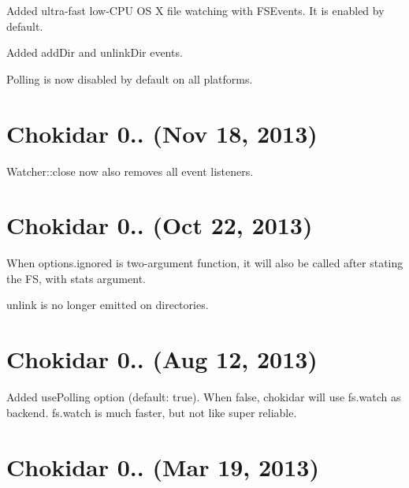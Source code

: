 \begin{DoxyItemize}
\item Added ultra-\/fast low-\/\+C\+PU OS X file watching with F\+S\+Events. It is enabled by default.
\item Added {\ttfamily add\+Dir} and {\ttfamily unlink\+Dir} events.
\item Polling is now disabled by default on all platforms.
\end{DoxyItemize}

\section*{Chokidar 0.. (Nov 18, 2013)}


\begin{DoxyItemize}
\item {\ttfamily Watcher\+::close} now also removes all event listeners.
\end{DoxyItemize}

\section*{Chokidar 0.. (Oct 22, 2013)}


\begin{DoxyItemize}
\item When {\ttfamily options.\+ignored} is two-\/argument function, it will also be called after stating the FS, with {\ttfamily stats} argument.
\item {\ttfamily unlink} is no longer emitted on directories.
\end{DoxyItemize}

\section*{Chokidar 0.. (Aug 12, 2013)}


\begin{DoxyItemize}
\item Added {\ttfamily use\+Polling} option (default\+: {\ttfamily true}). When {\ttfamily false}, chokidar will use {\ttfamily fs.\+watch} as backend. {\ttfamily fs.\+watch} is much faster, but not like super reliable.
\end{DoxyItemize}

\section*{Chokidar 0.. (Mar 19, 2013)}



